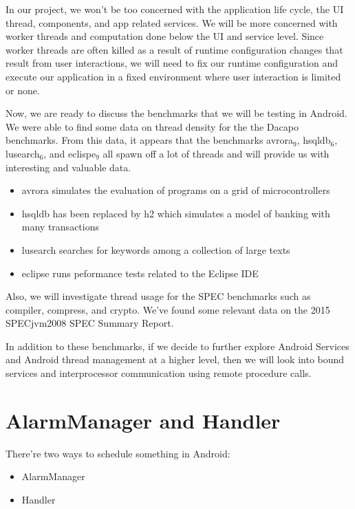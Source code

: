 \documentclass[11pt]{article}
\begin{document}
In our project, we won’t be too concerned with the application life cycle, the UI thread, components, and app related services.  We will be more concerned with worker threads and computation done below the UI and service level.  Since worker threads are often killed as a result of runtime configuration changes that result from user interactions, we will need to fix our runtime configuration and execute our application in a fixed environment where user interaction is limited or none.

Now, we are ready to discuss the benchmarks that we will be testing in Android.  We were able to find some data on thread density for the the Dacapo benchmarks.  From this data, it appears that the benchmarks avrora$_{\text{9}}$, hsqldb$_{\text{6}}$, lusearch$_{\text{6}}$, and eclispe$_{\text{9}}$ all spawn off a lot of threads and will provide us with interesting and valuable data.

\begin{itemize}
\item avrora simulates the evaluation of programs on a grid of microcontrollers
\item hsqldb has been replaced by h2 which simulates a model of banking with many transactions
\item lusearch searches for keywords among a collection of large texts
\item eclipse runs peformance tests related to the Eclipse IDE
\end{itemize}

Also, we will investigate thread usage for the SPEC benchmarks such as compiler, compress, and crypto.  We’ve found some relevant data on the 2015 SPECjvm2008 SPEC Summary Report.

In addition to these benchmarks, if we decide to further explore Android Services and Android thread management at a higher level, then we will look into bound services and interprocessor communication using remote procedure calls.

\section{AlarmManager and Handler}
\label{sec-6}
There're two ways to schedule something in Android:

\begin{itemize}
\item AlarmManager
\item Handler
\end{itemize}
\end{document}
